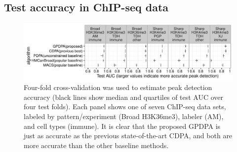 \documentclass[aoas]{imsart}
\newcommand{\url}[1]{\texttt{#1}}
\begin{document}



\subsection{Test accuracy in ChIP-seq data}


\begin{figure}[t!]
  \centering 
  \includegraphics[width=\textwidth]{figure-test-error-dots}
  \vskip -0.5cm
  \caption{Four-fold cross-validation was used to estimate peak
    detection accuracy (black lines show median and quartiles of test
    AUC over four test folds). Each panel shows one of seven ChIP-seq data
    sets, labeled by pattern/experiment (Broad H3K36me3), labeler
    (AM), and cell types (immune).  It is clear that the proposed
    GPDPA is just as accurate as the previous state-of-the-art CDPA,
    and both are more accurate than the other baseline methods.
  }
  \label{fig:test-error-dots}
\end{figure}
\end{document}
